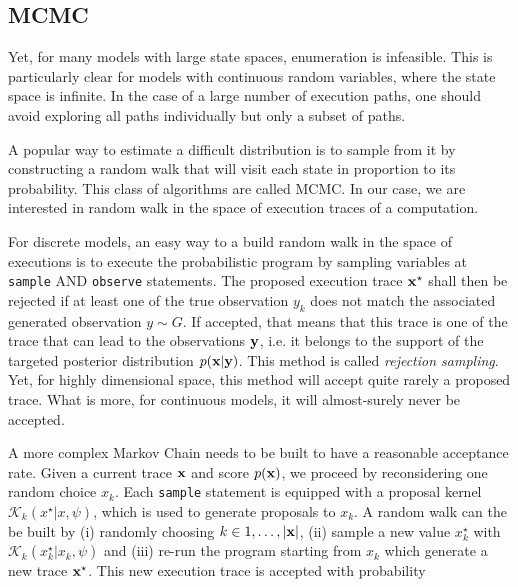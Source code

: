 \subsection{\gls{MCMC}}
Yet, for many models with large state spaces, enumeration is infeasible. This is particularly clear for models with continuous random variables, where the state space is infinite.
In the case of a large number of execution paths, one should avoid exploring all paths individually but only a subset of paths.

A popular way to estimate a difficult distribution is to sample from it by constructing a random walk that will visit each state in proportion to its probability. This class of algorithms are called \gls{MCMC}.
In our case, we are interested in random walk in the space of execution traces of a computation.

For discrete models, an easy way to a build random walk in the space of executions is to execute the probabilistic program by sampling variables at \texttt{sample} AND \texttt{observe} statements. The proposed execution trace $\boldsymbol{\mathbf{x}}^\star$ shall then be rejected if at least one of the true observation $y_k$ does not match the associated generated observation $y \sim G$. If accepted, that means that this trace is one of the trace that can lead to the observations $\boldsymbol{\mathbf{y}}$, i.e. it belongs to the support of the targeted posterior distribution $p(\boldsymbol{\mathbf{x}}|\boldsymbol{\mathbf{y}})$. This method is called \textit{rejection sampling}. Yet, for highly dimensional space, this method will accept quite rarely a proposed trace. What is more, for continuous models, it will almost-surely never be accepted.


A more complex Markov Chain needs to be built to have a reasonable acceptance rate.
Given a current trace $\boldsymbol{\mathbf{x}}$ and score $p(\boldsymbol{\mathbf{x}})$, we proceed by reconsidering one random choice $x_k$.
Each \texttt{sample} statement is equipped with a proposal kernel $\mathcal{K}_k(x^\star|x, \psi)$, which is used to generate proposals to $x_k$. A random walk can the be built by (i) randomly choosing $k \in {1,\dots,|\ensuremath{\boldsymbol{\mathbf{x}}}|}$, (ii) sample a new value $x_k^\star$ with $\mathcal{K}_k(x_k^\star|x_k, \psi)$ and (iii) re-run the program starting from $x_k$ which generate a new trace $\boldsymbol{\mathbf{x}}^\star$. This new execution trace is accepted with probability

